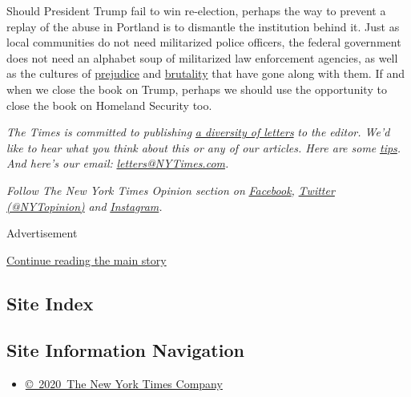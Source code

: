 Should President Trump fail to win re-election, perhaps the way to
prevent a replay of the abuse in Portland is to dismantle the
institution behind it. Just as local communities do not need militarized
police officers, the federal government does not need an alphabet soup
of militarized law enforcement agencies, as well as the cultures of
\href{https://www.propublica.org/article/secret-border-patrol-facebook-group-agents-joke-about-migrant-deaths-post-sexist-memes}{prejudice}
and
\href{https://www.aclu.org/issues/immigrants-rights/ice-and-border-patrol-abuses}{brutality}
that have gone along with them. If and when we close the book on Trump,
perhaps we should use the opportunity to close the book on Homeland
Security too.

\emph{The Times is committed to publishing}
\href{https://www.nytimes3xbfgragh.onion/2019/01/31/opinion/letters/letters-to-editor-new-york-times-women.html}{\emph{a
diversity of letters}} \emph{to the editor. We'd like to hear what you
think about this or any of our articles. Here are some}
\href{https://help.nytimes3xbfgragh.onion/hc/en-us/articles/115014925288-How-to-submit-a-letter-to-the-editor}{\emph{tips}}\emph{.
And here's our email:}
\href{mailto:letters@NYTimes.com}{\emph{letters@NYTimes.com}}\emph{.}

\emph{Follow The New York Times Opinion section on}
\href{https://www.facebookcorewwwi.onion/nytopinion}{\emph{Facebook}}\emph{,}
\href{http://twitter.com/NYTOpinion}{\emph{Twitter (@NYTopinion)}}
\emph{and}
\href{https://www.instagram.com/nytopinion/}{\emph{Instagram}}\emph{.}

Advertisement

\protect\hyperlink{after-bottom}{Continue reading the main story}

\hypertarget{site-index}{%
\subsection{Site Index}\label{site-index}}

\hypertarget{site-information-navigation}{%
\subsection{Site Information
Navigation}\label{site-information-navigation}}

\begin{itemize}
\tightlist
\item
  \href{https://help.nytimes3xbfgragh.onion/hc/en-us/articles/115014792127-Copyright-notice}{©~2020~The
  New York Times Company}
\end{itemize}

